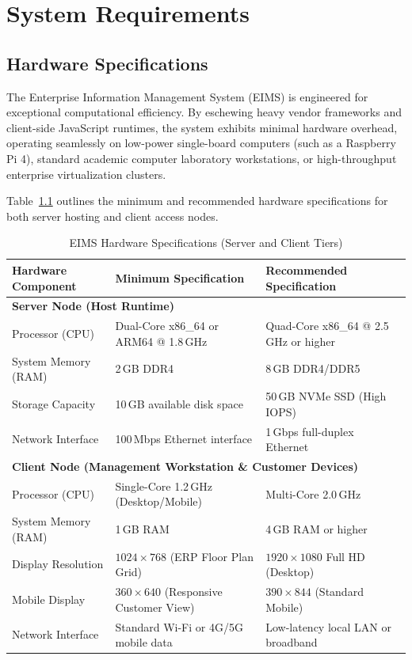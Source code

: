 \chapter{System Requirements}
\label{chap:system_requirements}

\section{Hardware Specifications}
\label{sec:req_hardware}
The Enterprise Information Management System (EIMS) is engineered for exceptional computational efficiency. By eschewing heavy vendor frameworks and client-side JavaScript runtimes, the system exhibits minimal hardware overhead, operating seamlessly on low-power single-board computers (such as a Raspberry Pi 4), standard academic computer laboratory workstations, or high-throughput enterprise virtualization clusters.

Table~\ref{tab:hardware_requirements} outlines the minimum and recommended hardware specifications for both server hosting and client access nodes.

\begin{table}[htbp]
\centering
\caption{EIMS Hardware Specifications (Server and Client Tiers)}
\label{tab:hardware_requirements}
\small
\begin{tabularx}{\textwidth}{lp{6.2cm}X}
\toprule
\textbf{Hardware Component} & \textbf{Minimum Specification} & \textbf{Recommended Specification} \\
\midrule
\multicolumn{3}{l}{\textbf{Server Node (Host Runtime)}} \\
Processor (CPU) & Dual-Core x86\_64 or ARM64 @ 1.8\,GHz & Quad-Core x86\_64 @ 2.5\,GHz or higher \\
System Memory (RAM) & 2\,GB DDR4 & 8\,GB DDR4/DDR5 \\
Storage Capacity & 10\,GB available disk space & 50\,GB NVMe SSD (High IOPS) \\
Network Interface & 100\,Mbps Ethernet interface & 1\,Gbps full-duplex Ethernet \\
\midrule
\multicolumn{3}{l}{\textbf{Client Node (Management Workstation \& Customer Devices)}} \\
Processor (CPU) & Single-Core 1.2\,GHz (Desktop/Mobile) & Multi-Core 2.0\,GHz \\
System Memory (RAM) & 1\,GB RAM & 4\,GB RAM or higher \\
Display Resolution & $1024 \times 768$ (ERP Floor Plan Grid) & $1920 \times 1080$ Full HD (Desktop) \\
Mobile Display & $360 \times 640$ (Responsive Customer View) & $390 \times 844$ (Standard Mobile) \\
Network Interface & Standard Wi-Fi or 4G/5G mobile data & Low-latency local LAN or broadband \\
\bottomrule
\end{tabularx}
\end{table}


